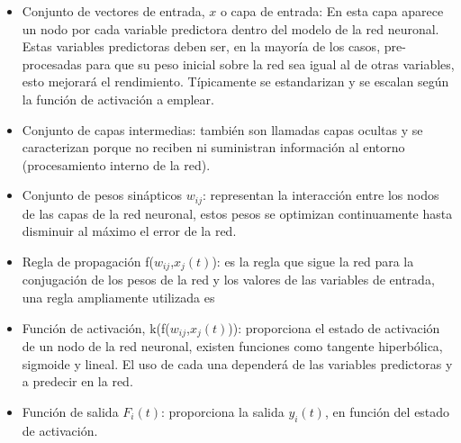 \begin{itemize}
	\item Conjunto de vectores de entrada, $x$ o capa de entrada: En esta capa aparece un nodo por cada variable predictora dentro del modelo de la red neuronal. Estas variables predictoras deben ser, en la mayoría de los casos, pre-procesadas para que su peso inicial sobre la red sea igual al de otras variables, esto mejorará el rendimiento. Típicamente se estandarizan y se escalan según la función de activación a emplear.
	\item Conjunto de capas intermedias: también son llamadas capas ocultas y se caracterizan porque no reciben ni suministran información al entorno (procesamiento interno de la red).
	\item Conjunto de pesos sinápticos $w_{ij}$: representan la interacción entre los nodos de las capas de la red neuronal, estos pesos se optimizan continuamente hasta disminuir al máximo el error de la red.
	\item Regla de propagación f($w_{ij}$,$x_{j}(t)$): es la regla que sigue la red para la conjugación de los pesos de la red y los valores de las variables de entrada, una regla ampliamente utilizada es 
	\item Función de activación, k(f($w_{ij}$,$x_{j}(t)$)): proporciona el estado de activación de un nodo de la red neuronal, existen funciones como tangente hiperbólica, sigmoide y lineal. El uso de cada una dependerá de las variables predictoras y a predecir en la red.
	\item Función de salida $F_{i}(t)$: proporciona la salida $y_{i}(t)$, en función del estado de activación.
\end{itemize}
